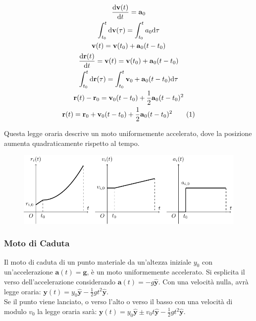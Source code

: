 \documentclass{article}
\newcommand{\vect}[1]{\boldsymbol{\mathbf{#1}}}
\newcommand{\df}{\mathrm{d}}
\numberwithin{equation}{subsection}
\begin{document}
\begin{gather*}
    \displaystyle\frac{\df\vect{v}(t)}{\df t}=\vect{a}_0\\
    \displaystyle\int_{t_0}^t\df\vect{v}(\tau)=\int_{t_0}^ta_0\df\tau\\
    \vect{v}(t)=\vect{v}(t_0)+\vect{a}_0(t-t_0)\\
    \displaystyle\frac{\df\vect{r}(t)}{\df t}=\vect{v}(t)=\vect{v}(t_0)+\vect{a}_0(t-t_0)\\
    \displaystyle\int_{t_0}^t\df\vect{r}(\tau)=\int_{t_0}^{t}\vect{v}_0+\vect{a}_0(t-t_0)\df\tau\\
    \vect{r}(t)-\vect{r}_0=\vect{v}_0(t-t_0)+\displaystyle\frac{1}{2}\vect{a}_0(t-t_0)^2\\
    \vect{r}(t)=\vect{r}_0+\vect{v}_0(t-t_0)+\displaystyle\frac{1}{2}\vect{a}_0(t-t_0)^2\tag{\stepcounter{equation}\theequation}
\end{gather*}

Questa legge oraria descrive un moto uniformemente accelerato, 
dove la posizione aumenta quadraticamente rispetto al tempo. 


\begin{figure}[H]%
    \centering
    \includegraphics{uniformemente-accelerato.pdf}%
\end{figure}

\subsubsection{Moto di Caduta}


Il moto di caduta di un punto materiale da un'altezza iniziale $y_0$ 
con un'accelerazione 
$\vect{a}(t) = \vect{g}$, 
è un moto uniformemente accelerato. Si esplicita il verso dell'accelerazione considerando $\vect{a}(t)=-g\hat{\vect{y}}$. Con una velocità nulla, avrà  
legge oraria: $\vect y(t)= y_0\hat{\vect{y}} -\displaystyle\frac{1}{2}gt^{2}\hat{\vect{y}}$.
\\
Se il punto viene lanciato, o verso l'alto o verso il basso
con una velocità di modulo $v_0$ la legge oraria sarà: 
$\vect y(t) = y_0\hat{\vect{y}} \pm v_0t\hat{\vect{y}}-\displaystyle\frac{1}{2}gt^{2}\hat{\vect{y}}$.
\end{document}
